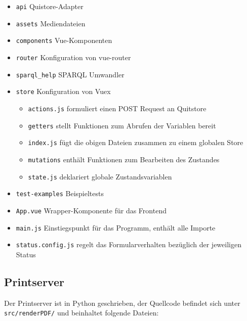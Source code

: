 \documentclass[a4paper,11pt,oneside, titlepage]{article}
\begin{document}
    \begin{itemize}
      \item \verb+api+ Quistore-Adapter
      \item \verb+assets+ Mediendateien
      \item \verb+components+ Vue-Komponenten
      \item \verb+router+ Konfiguration von vue-router
      \item \verb+sparql_help+ SPARQL Umwandler
      \item \verb+store+ Konfiguration von Vuex
        \begin{itemize}
          \item \verb+actions.js+ formuliert einen POST Request an Quitstore
          \item \verb+getters+ stellt Funktionen zum Abrufen der Variablen bereit
          \item \verb+index.js+ fügt die obigen Dateien zusammen zu einem globalen Store
          \item \verb+mutations+ enthält Funktionen zum Bearbeiten des Zustandes
          \item \verb+state.js+ deklariert globale Zustandsvariablen
        \end{itemize}
      \item \verb+test-examples+ Beispieltests
      \item \verb+App.vue+ Wrapper-Komponente für das Frontend
      \item \verb+main.js+ Einstiegspunkt für das Programm, enthält alle Importe
      \item \verb+status.config.js+ regelt das Formularverhalten bezüglich der jeweiligen Status
    \end{itemize}

\begin{minipage}{16cm}
\end{minipage}

\subsection{Printserver}
Der Printserver ist in Python geschrieben, der Quellcode befindet sich unter \verb|src/renderPDF/| und beinhaltet folgende Dateien:
\end{document}
